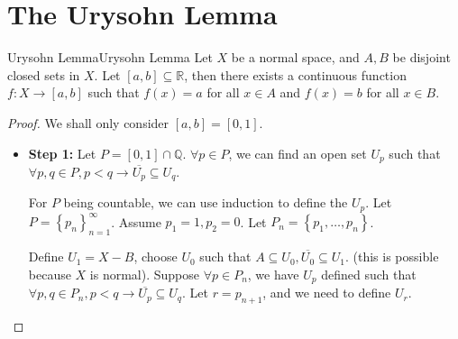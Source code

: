 \documentclass[../main.tex]{subfiles}
\begin{document}
\section{The Urysohn Lemma}

\begin{theorem}{Urysohn Lemma}{Urysohn Lemma}
	Let $X$ be a normal space, and $A,B$ be disjoint closed sets in $X$. Let $[a,b] \subseteq \mathbb{R}$, then there exists a continuous function $f: X \rightarrow [a,b]$ such that $f(x) = a$ for all $x\in A$ and $f(x) = b$ for all $x\in B$.
\end{theorem}
\begin{proof}
	We shall only consider $[a,b] = [0,1]$.
	\begin{itemize}
		\item \textbf{Step 1: } Let $P = [0,1]\cap \mathbb{Q}$. $\forall p\in P$, we can find an open set $U_p$ such that $\forall p,q\in P, p < q \rightarrow \overline{U_p}\subseteq U_q$.

		For $P$ being countable, we can use induction to define the $U_p$. Let $P = \left\{ p_n \right\}_{n=1}^{\infty }$. Assume $p_1 = 1,p_2=0$. Let $P_n = \left\{ p_1, \ldots ,p_n \right\}$.

		Define $U_1 = X-B$, choose $U_0$ such that $A \subseteq U_0,\overline{U_0}\subseteq U_1$. (this is possible because $X$ is normal). Suppose $\forall p\in P_n$, we have $U_p$ defined such that $\forall p,q\in P_n, p<q \rightarrow \overline{U_p} \subseteq U_q$. Let $r = p_{n+1}$, and we need to define $U_r$.


\end{itemize}
\end{proof}
\end{document}
